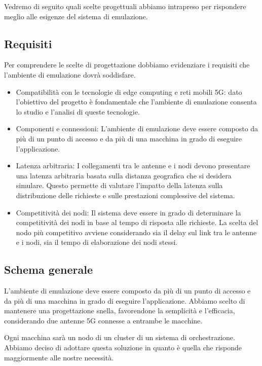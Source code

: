 \documentclass[12pt, hidelinks]{report}
\begin{document}
Vedremo di seguito quali scelte progettuali abbiamo intrapreso per rispondere meglio alle esigenze del sistema di emulazione. 

\subsection{Requisiti}
Per comprendere le scelte di progettazione dobbiamo evidenziare i requisiti che l'ambiente di emulazione dovrà soddisfare.

\begin{itemize}
    \item Compatibilità con le tecnologie di edge computing e reti mobili 5G: dato l'obiettivo del progetto è fondamentale che l'ambiente di emulazione consenta lo studio e l'analisi di queste tecnologie.

    \item Componenti e connessioni: L'ambiente di emulazione deve essere composto da più di un punto di accesso e da più di una macchina in grado di eseguire l'applicazione.

    \item Latenza arbitraria: I collegamenti tra le antenne e i nodi devono presentare una latenza arbitraria basata sulla distanza geografica che si desidera simulare. Questo permette di valutare l'impatto della latenza sulla distribuzione delle richieste e sulle prestazioni complessive del sistema.

    \item Competitività dei nodi: Il sistema deve essere in grado di determinare la competitività dei nodi in base al tempo di risposta alle richieste. La scelta del nodo più competitivo avviene considerando sia il delay sul link tra le antenne e i nodi, sia il tempo di elaborazione dei nodi stessi.
\end{itemize}

\subsection{Schema generale}
L'ambiente di emulazione deve essere composto da più di un punto di accesso e da più di una macchina in grado di eseguire l'applicazione. Abbiamo scelto di mantenere una progettazione snella, favorendone la semplicità e l'efficacia, considerando due antenne 5G connesse a entrambe le macchine.

Ogni macchina sarà un nodo di un cluster di un sistema di orchestrazione. Abbiamo deciso di adottare questa soluzione in quanto è quella che risponde maggiormente alle nostre necessità.
\end{document}
